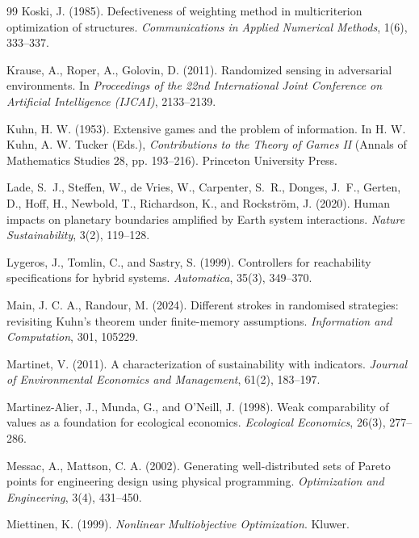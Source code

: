 \documentclass[preprint,11pt,authoryear]{elsarticle}
\theoremstyle{definition}
\theoremstyle{remark}
\begin{document}
\begin{thebibliography}{99}
 Koski, J. (1985). Defectiveness of weighting method in multicriterion optimization of structures. \emph{Communications in Applied Numerical Methods}, 1(6), 333--337.

 Krause, A., Roper, A., Golovin, D. (2011). Randomized sensing in adversarial environments. In \emph{Proceedings of the 22nd International Joint Conference on Artificial Intelligence (IJCAI)}, 2133--2139.

 Kuhn, H. W. (1953). Extensive games and the problem of information. In H. W. Kuhn, A. W. Tucker (Eds.), \emph{Contributions to the Theory of Games II} (Annals of Mathematics Studies 28, pp. 193--216). Princeton University Press.

 Lade, S.~J., Steffen, W., de Vries, W., Carpenter, S.~R., Donges, J.~F., Gerten, D., Hoff, H., Newbold, T., Richardson, K., and Rockstr\"om, J. (2020). Human impacts on planetary boundaries amplified by Earth system interactions. \emph{Nature Sustainability}, 3(2), 119--128.

 Lygeros, J., Tomlin, C., and Sastry, S. (1999). Controllers for reachability specifications for hybrid systems. \emph{Automatica}, 35(3), 349--370.

 Main, J. C. A., Randour, M. (2024). Different strokes in randomised strategies: revisiting Kuhn's theorem under finite-memory assumptions. \emph{Information and Computation}, 301, 105229.

 Martinet, V. (2011). A characterization of sustainability with indicators. \emph{Journal of Environmental Economics and Management}, 61(2), 183--197.

 Martinez-Alier, J., Munda, G., and O'Neill, J. (1998). Weak comparability of values as a foundation for ecological economics. \emph{Ecological Economics}, 26(3), 277--286.

 Messac, A., Mattson, C. A. (2002). Generating well-distributed sets of Pareto points for engineering design using physical programming. \emph{Optimization and Engineering}, 3(4), 431--450.

 Miettinen, K. (1999). \emph{Nonlinear Multiobjective Optimization}. Kluwer.


\end{thebibliography}
\end{document}
